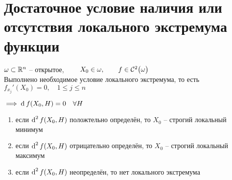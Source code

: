 \section{Достаточное условие наличия или отсутствия локального экстремума функции}

\begin{theorem}
	$ \omega \sub \R^n $ -- открытое, $ \qquad X_0 \in \omega, \qquad f \in \Cont[2]\omega $ \\
	Выполнено необходимое условие локального экстремума, то есть $ f_{x_j}'(X_0) = 0, \quad 1 \le j \le n $
	\begin{remark}
		$ \implies \di f(X_0, H) = 0 \quad \forall H $
	\end{remark}
	\begin{enumerate}
		\item\label{th:extremum:4} если $ \di[2] f(X_0, H) $ положтельно определён, то $ X_0 $ -- строгий локальный минимум

		\item\label{th:extremum:5} если $ \di[2] f(X_0, H) $ отрицательно определён, то $ X_0 $ -- строгий локальный максимум

		\item\label{th:extremum:6} если $ \di[2] f(X_0, H) $ неопределён, то нет локального экстремума
	\end{enumerate}
\end{theorem}


